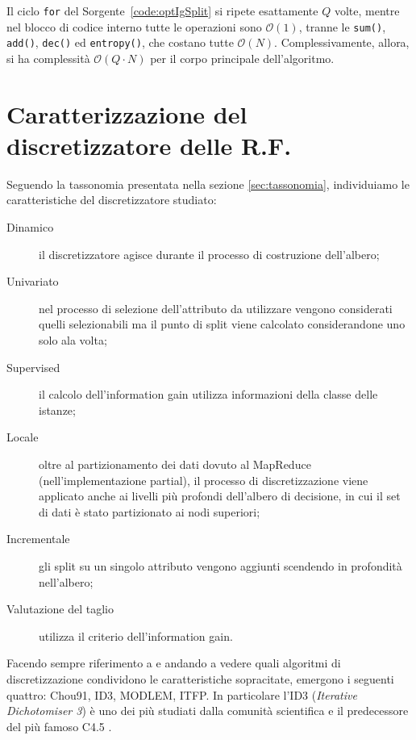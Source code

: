 \documentclass[a4paper,11pt,twoside,openright,fleqn]{book}
\renewcommand{\lstlistingname}{Sorgente}
\newcommand{\code}[1]{\texttt{#1}}
\newcommand{\bigO}{\mathcal{O}}
\begin{document}
Il ciclo \code{for} del \lstlistingname\ \ref{code:optIgSplit} si ripete esattamente $Q$ volte, mentre nel blocco di codice interno tutte le operazioni sono $\bigO(1)$, tranne le \code{sum()}, \code{add()}, \code{dec()} ed \code{entropy()}, che costano tutte $\bigO(N)$. Complessivamente, allora, si ha complessità $\bigO(Q \cdot N)$ per il corpo principale dell'algoritmo.

\section{Caratterizzazione del discretizzatore delle R.F.} \label{sec:caratterizzazione}

Seguendo la tassonomia presentata nella sezione \ref{sec:tassonomia}, individuiamo le caratteristiche del discretizzatore studiato:

\begin{description}
\item[Dinamico] il discretizzatore agisce durante il processo di costruzione dell'albero;
\item[Univariato] nel processo di selezione dell'attributo da utilizzare vengono considerati quelli selezionabili ma il punto di split viene calcolato considerandone uno solo ala volta;
\item[Supervised] il calcolo dell'information gain utilizza informazioni della classe delle istanze;
\item[Locale] oltre al partizionamento dei dati dovuto al MapReduce (nell'implementazione partial), il processo di discretizzazione viene applicato anche ai livelli più profondi dell'albero di decisione, in cui il set di dati è stato partizionato ai nodi superiori;
\item[Incrementale] gli split su un singolo attributo vengono aggiunti scendendo in profondità nell'albero;
\item[Valutazione del taglio] utilizza il criterio dell'information gain.
\end{description}

Facendo sempre riferimento a \cite{Garcia:2013} e andando a vedere quali algoritmi di discretizzazione condividono le caratteristiche sopracitate, emergono i seguenti quattro: Chou91, ID3, MODLEM, ITFP. In particolare l'ID3 \cite{Quinlan:1993} (\emph{Iterative Dichotomiser 3}) è uno dei più studiati dalla comunità scientifica e il predecessore del più famoso C4.5 \cite{Quinlan:1996}.

\end{document}
